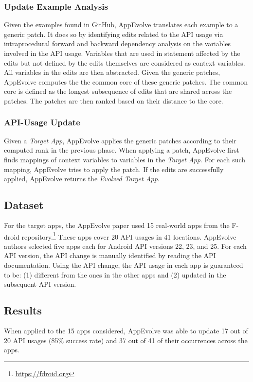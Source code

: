 \subsubsection{Update Example Analysis}
Given the examples found in GitHub, AppEvolve translates each example to a generic patch. It does so by identifying edits related to the API usage via intraprocedural forward and backward dependency analysis on the variables involved in the API usage. Variables that are used in statement affected by the edits but not defined by the edits themselves are considered as context variables. All variables in the edits are then abstracted. Given the generic patches, AppEvolve computes the the common core of these generic patches. The common core is defined as the longest subsequence of edits that are shared across the patches. The patches are then ranked based on their distance to the core.

\subsubsection{API-Usage Update}
Given a {\em Target App}, AppEvolve applies the generic patches according to their computed rank in the previous phase. When applying a patch, AppEvolve first finds mappings of context variables to variables in the {\em Target App}. For each such mapping, AppEvolve tries to apply the patch. If the edits are successfully applied, AppEvolve returns the {\em Evolved Target App}.

\subsection{Dataset}
For the target apps, the AppEvolve paper used 15 real-world apps from the F-droid repository.\footnote{\url{https://fdroid.org}} These  apps cover 20 API usages in 41 locations. AppEvolve authors selected five apps each for Android API versions 22, 23, and 25. For each API version, the API change is manually identified by reading the API
documentation. Using the API change, the API usage in each app is guaranteed to be: (1) different from the ones in the other apps and (2)
updated in the subsequent API version. 

\subsection{Results}
When applied to the 15 apps considered, AppEvolve was able to update 17 out of 20 API usages (85\% success rate) and 37 out of 41 of their occurrences across the apps.